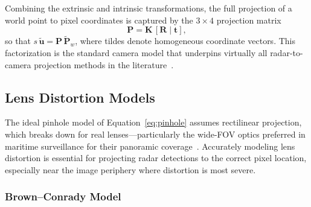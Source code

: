 Combining the extrinsic and intrinsic transformations, the full projection of a world point to pixel coordinates is captured by the $3\times 4$ projection matrix
\begin{equation}\label{eq:full_projection}
  \mathbf{P} = \mathbf{K}\,[\mathbf{R} \mid \mathbf{t}],
\end{equation}
so that $s\,\tilde{\mathbf{u}} = \mathbf{P}\,\tilde{\mathbf{P}}_w$, where tildes denote homogeneous coordinate vectors. This factorization is the standard camera model that underpins virtually all radar-to-camera projection methods in the literature~\cite{Nabati2021CenterFusion, Kim2020GRIFNet, Caesar2020nuScenes}.

\subsection{Lens Distortion Models}\label{subsec:distortion}

The ideal pinhole model of Equation~\eqref{eq:pinhole} assumes rectilinear projection, which breaks down for real lenses---particularly the wide-FOV optics preferred in maritime surveillance for their panoramic coverage~\cite{xu2024maritime}. Accurately modeling lens distortion is essential for projecting radar detections to the correct pixel location, especially near the image periphery where distortion is most severe.

\subsubsection{Brown--Conrady Model}


